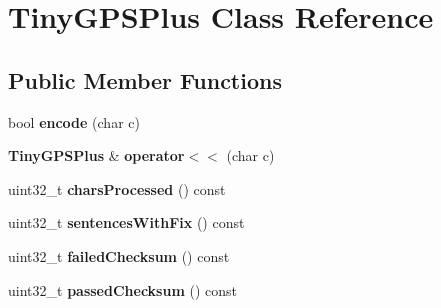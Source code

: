 \section{Tiny\+G\+P\+S\+Plus Class Reference}
\label{class_tiny_g_p_s_plus}
\subsection*{Public Member Functions}
\begin{DoxyCompactItemize}
\item 
bool {\bfseries encode} (char c)\label{class_tiny_g_p_s_plus_ad7b78320b7e4967df17c6a27008a5154}

\item 
{\bf Tiny\+G\+P\+S\+Plus} \& {\bfseries operator$<$$<$} (char c)\label{class_tiny_g_p_s_plus_a32a0b61a25ce0c490216cb2b4ea19ced}

\item 
uint32\+\_\+t {\bfseries chars\+Processed} () const \label{class_tiny_g_p_s_plus_a12b6bc0169ee6b2f0beb8041e549f338}

\item 
uint32\+\_\+t {\bfseries sentences\+With\+Fix} () const \label{class_tiny_g_p_s_plus_a6c502ec591dc42a83771a502c4dbdcd4}

\item 
uint32\+\_\+t {\bfseries failed\+Checksum} () const \label{class_tiny_g_p_s_plus_a57dd7a4430d58f784e967ee2d76e574f}

\item 
uint32\+\_\+t {\bfseries passed\+Checksum} () const \label{class_tiny_g_p_s_plus_a55af5d3442bf8f5c5fdd0309e416d9e5}

\end{DoxyCompactItemize}
